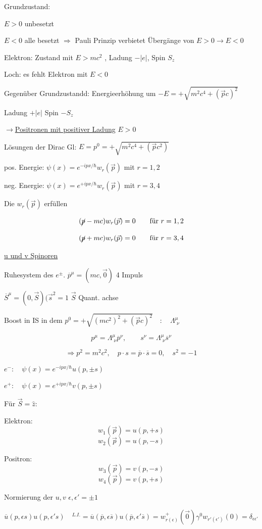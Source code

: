 Grundzustand:

 \(E>0\) unbesetzt

\(E<0\) alle besetzt \(\Rightarrow \) Pauli Prinzip verbietet Übergänge von \(E>0 \rightarrow E<0 \)

Elektron: Zustand mit \(E>mc^2\) , Ladung \(-|e|\), Spin \(S_z\)

Loch: es fehlt Elektron mit \(E<0\)

Gegenüber Grundzustandd: Energieerhöhung um \(-E = +\sqrt{m^2c^4+(\vec pc)^2}\)

Ladung \(+|e|\)
Spin \(-S_z\)

\(\rightarrow \)\underline{Positronen mit positiver Ladung} \(E>0\)

Lösungen der Dirac Gl: \(E=p^0 = +\sqrt{m^2c^4+(\vec pc^2)}\)

pos. Energie: \(\psi(x) = e^{-ipx/\hbar}w_r(\vec p)\) mit \(r=1,2\)

neg. Energie: \(\psi(x) = e^{+ipx/\hbar}w_r(\vec p)\) mit \(r=3,4\)

Die \(w_r(\vec p)\) erfüllen

\[(\cancel p - mc)w_r(\vec p) = 0 \qquad\text{für } r=1,2\]

\[(\cancel p + mc)w_r(\vec p) = 0 \qquad\text{für } r=3,4\]


\underline{u und v Spinoren}


Ruhesystem des \(e^{\pm}\). \(\overline p^\mu = (mc,\vec 0)\) 4 Impuls 

\(\overline S^\mu = (0,\vec S)(\vec s^2=1\)  \(\vec S\) Quant. achse


Boost in IS in dem \(p^0 = +\sqrt{(mc^2)^2+(\vec p c)^2}\quad:\quad \Lambda^\mu_{\,\,\nu} \)

\[p^\mu = \Lambda^\mu_{\,\,\nu}\overline p^\nu, \qquad s^\nu =\Lambda^\mu_{\,\,\nu}\overline s^\nu \]

\[\Rightarrow p^2=m^2c^2, \quad p\cdot s = \overline p\cdot \overline s = 0,\quad s^2 = -1\]

\(e^-:\quad \psi(x) = e^{-ipx/\hbar}u(p,\pm s)\)

\(e^+:\quad \psi(x) = e^{+ipx/\hbar}v(p,\pm s)\)


Für \(\vec S = \hat z\):

Elektron:
\[w_1(\vec p) = u(p,+s)\]
\[w_2(\vec p) = u(p,-s)\]

Positron:
\[w_3(\vec p) = v(p,-s)\]
\[w_4(\vec p) = v(p,+s)\]

Normierung der \(u,v\) \(\epsilon,\epsilon' = \pm 1\)

\[\overline u(p,\epsilon s) u(p,\epsilon' s)\quad ^{L.I.}= \overline u(\overline p,\epsilon\overline s)  u(\overline p,\epsilon'\overline s) = w^+_{r(\epsilon)}(\vec 0)\gamma^0w_{r'(\epsilon')}(0) = \delta_{\epsilon\epsilon'}\]

